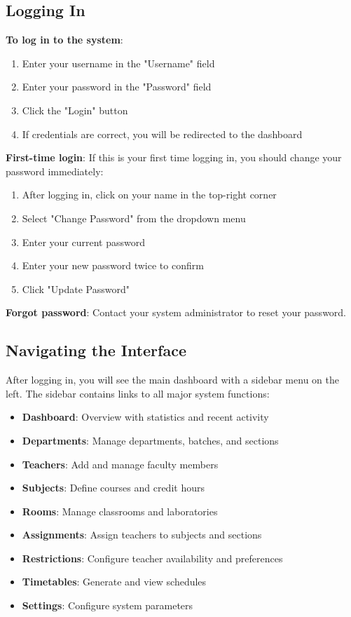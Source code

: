 \documentclass[12pt,a4paper]{article}
\begin{document}
\subsection{Logging In}

\textbf{To log in to the system}:
\begin{enumerate}
\item Enter your username in the "Username" field
\item Enter your password in the "Password" field
\item Click the "Login" button
\item If credentials are correct, you will be redirected to the dashboard
\end{enumerate}

\textbf{First-time login}: If this is your first time logging in, you should change your password immediately:
\begin{enumerate}
\item After logging in, click on your name in the top-right corner
\item Select "Change Password" from the dropdown menu
\item Enter your current password
\item Enter your new password twice to confirm
\item Click "Update Password"
\end{enumerate}

\textbf{Forgot password}: Contact your system administrator to reset your password.

\subsection{Navigating the Interface}

After logging in, you will see the main dashboard with a sidebar menu on the left. The sidebar contains links to all major system functions:

\begin{itemize}
\item \textbf{Dashboard}: Overview with statistics and recent activity
\item \textbf{Departments}: Manage departments, batches, and sections
\item \textbf{Teachers}: Add and manage faculty members
\item \textbf{Subjects}: Define courses and credit hours
\item \textbf{Rooms}: Manage classrooms and laboratories
\item \textbf{Assignments}: Assign teachers to subjects and sections
\item \textbf{Restrictions}: Configure teacher availability and preferences
\item \textbf{Timetables}: Generate and view schedules
\item \textbf{Settings}: Configure system parameters
\end{itemize}
\end{document}
